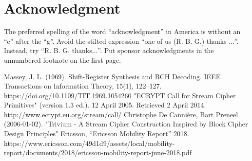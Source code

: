 \documentclass[conference]{IEEEtran}
\begin{document}
\section*{Acknowledgment}

The preferred spelling of the word ``acknowledgment'' in America is without
an ``e'' after the ``g''. Avoid the stilted expression ``one of us (R. B.
G.) thanks $\ldots$''. Instead, try ``R. B. G. thanks$\ldots$''. Put sponsor
acknowledgments in the unnumbered footnote on the first page.

\begin{thebibliography}{00}
 Massey, J. L. (1969). Shift-Register Synthesis and BCH Decoding. IEEE Transactions on Information Theory, 15(1), 122–127. https://doi.org/10.1109/TIT.1969.1054260
 "ECRYPT Call for Stream Cipher Primitives" (version 1.3 ed.). 12 April 2005. Retrieved 2 April 2014. http://www.ecrypt.eu.org/stream/call/
 Christophe De Cannière, Bart Preneel (2006-01-02). "Trivium - A Stream Cipher Construction Inspired by Block Cipher Design Principles"
 Ericsson, “Ericsson
Mobility Report” 2018. https://www.ericsson.com/49d1d9/assets/local/mobility-report/documents/2018/ericsson-mobility-report-june-2018.pdf
\end{thebibliography}
\end{document}
